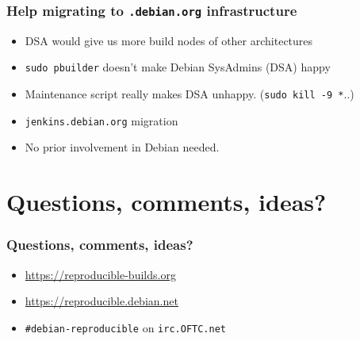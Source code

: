 \documentclass[14pt]{beamer}
\begin{document}
\begin{frame}
 \frametitle{Help migrating to \texttt{.debian.org} infrastructure}

 \begin{itemize}
  \item DSA would give us more build nodes of other architectures
  \item \texttt{sudo pbuilder} doesn't make Debian SysAdmins (DSA) happy
  \item Maintenance script really makes DSA unhappy. (\texttt{sudo kill -9 *}..)
  \item<2-3> \texttt{jenkins.debian.org} migration
  \item<3> No prior involvement in Debian needed.
 \end{itemize}
\end{frame}

\section{Questions, comments, ideas?}


\begin{frame}
 \frametitle{Questions, comments, ideas?}

 \begin{itemize}
  \item \url{https://reproducible-builds.org}
  \item \url{https://reproducible.debian.net}
  \item \texttt{\#debian-reproducible} on \texttt{irc.OFTC.net}
 \end{itemize}
\end{frame}
\end{document}
